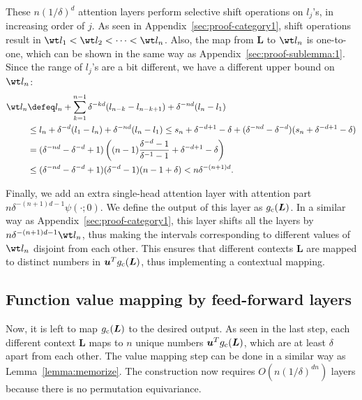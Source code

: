 \documentclass{article} %
\def\vu{{\bm{u}}}
\def\mL{{\bm{L}}}
\begin{document}
These $n(1/\delta)^d$ attention layers perform selective shift operations on $l_j$'s, in increasing order of $j$. As seen in Appendix~\ref{sec:proof-category1}, shift operations result in $\wt l_1 < \wt l_2 <\dots<\wt l_n$. Also, the map from $\mL$ to $\wt l_n$ is one-to-one, which can be shown in the same way as Appendix~\ref{sec:proof-sublemma:1}. Since the range of $l_j$'s are a bit different, we have a different upper bound on $\wt l_n$:
\begin{align*}
    \wt l_n
    &\defeq l_n + \sum_{k=1}^{n-1} \delta^{-kd}(l_{n-k}-l_{n-k+1}) + \delta^{-nd} (l_n-l_1)\\
    &\leq l_n + \delta^{-d} (l_1 - l_n) + \delta^{-nd}(l_n - l_1)
    \leq s_n + \delta^{-d+1} - \delta + (\delta^{-nd} - \delta^{-d}) (s_n + \delta^{-d+1} - \delta)\\
    &=(\delta^{-nd} - \delta^{-d} + 1) \left ( (n-1) \frac{\delta^{-d}-1}{\delta^{-1}-1} + \delta^{-d+1} - \delta  \right )\\
    &\leq (\delta^{-nd} - \delta^{-d} + 1) (\delta^{-d} - 1) (n-1+\delta)
    < n\delta^{-(n+1)d}.
\end{align*}

Finally, we add an extra single-head attention layer with attention part $n\delta^{-(n+1)d-1} \psi(\cdot;0)$. We define the output of this layer as $g_{\rm c}(\mL)$. In a similar way as Appendix~\ref{sec:proof-category1}, this layer shifts all the layers by $n \delta^{-(n+1)d-1} \wt l_n$, thus making the intervals corresponding to different values of $\wt l_n$ disjoint from each other. This ensures that different contexts $\mL$ are mapped to distinct numbers in $\vu^T g_{\rm c}(\mL)$, thus implementing a contextual mapping.


\subsection{Function value mapping by feed-forward layers}
Now, it is left to map $g_{\rm c}(\mL)$ to the desired output.
As seen in the last step, each different context $\mL$ maps to $n$ unique numbers $\vu^T g_{\rm c}(\mL)$, which are at least $\delta$ apart from each other. The value mapping step can be done in a similar way as Lemma~\ref{lemma:memorize}. 
The construction now requires $O(n(1/\delta)^{dn})$ layers because there is no permutation equivariance.



\end{document}

